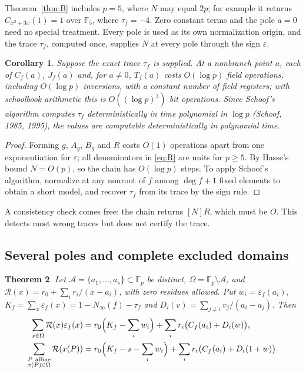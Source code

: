 \documentclass[11pt,a4paper]{article}
\numberwithin{equation}{section}
\theoremstyle{plain}
\newtheorem{theorem}{Theorem}[section]
\newtheorem{corollary}[theorem]{Corollary}
\theoremstyle{definition}
\newcommand{\F}{\mathbb{F}}
\newcommand{\eps}{\varepsilon}
\begin{document}
Theorem~\ref{thm:B} includes $p=5$, where $N$ may equal $2p$; for example it returns $C_{x^3+3x}(1)=1$ over $\F_5$, where $\tau_f=-4$. Zero constant terms and the pole $a=0$ need no special treatment. Every pole is used as its own normalization origin, and the trace $\tau_f$, computed once, supplies $N$ at every pole through the sign $\eps$.

\begin{corollary}\label{cor:cost}
Suppose the exact trace $\tau_f$ is supplied. At a nonbranch point $a$, each of $C_f(a)$, $J_f(a)$ and, for $a\neq0$, $T_f(a)$ costs $O(\log p)$ field operations, including $O(\log p)$ inversions, with a constant number of field registers; with schoolbook arithmetic this is $O((\log p)^3)$ bit operations. Since Schoof's algorithm computes $\tau_f$ deterministically in time polynomial in $\log p$ (Schoof, 1985, 1995), the values are computable deterministically in polynomial time.
\end{corollary}

\begin{proof}
Forming $g$, $A_g$, $B_g$ and $R$ costs $O(1)$ operations apart from one exponentiation for $\eps$; all denominators in \eqref{eq:R} are units for $p\ge5$. By Hasse's bound $N=O(p)$, so the chain has $O(\log p)$ steps. To apply Schoof's algorithm, normalize at any nonroot of $f$ among $\deg f+1$ fixed elements to obtain a short model, and recover $\tau_f$ from its trace by the sign rule.
\end{proof}

A consistency check comes free: the chain returns $[N]R$, which must be $O$. This detects most wrong traces but does not certify the trace.

\subsection{Several poles and complete excluded domains}
\begin{theorem}\label{thm:weights}
Let $\mathcal A=\{a_1,\dots,a_s\}\subset\F_p$ be distinct, $\Omega=\F_p\setminus\mathcal A$, and $\mathcal R(x)=r_0+\sum_ir_i/(x-a_i)$, with zero residues allowed. Put $w_i=\eps_f(a_i)$, $K_f=\sum_x\eps_f(x)=1-N_\infty(f)-\tau_f$ and $D_i(v)=\sum_{j\neq i}v_j/(a_i-a_j)$. Then
\begin{align}
\sum_{x\in\Omega}\mathcal R(x)\eps_f(x)&=r_0\Bigl(K_f-\sum_iw_i\Bigr)+\sum_ir_i\bigl(C_f(a_i)+D_i(w)\bigr),\label{eq:weights-char}\\
\sum_{\substack{P\ \text{affine}\\ x(P)\in\Omega}}\mathcal R(x(P))&=r_0\Bigl(K_f-s-\sum_iw_i\Bigr)+\sum_ir_i\bigl(C_f(a_i)+D_i(1+w)\bigr).\label{eq:weights-pt}
\end{align}
\end{theorem}
\end{document}
